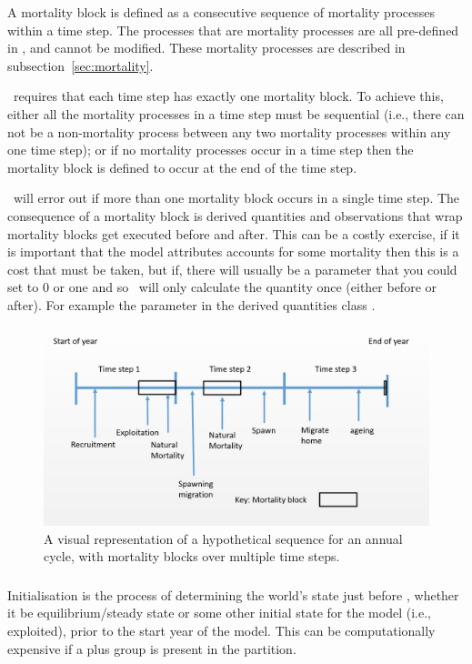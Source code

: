 A mortality block is defined as a consecutive sequence of mortality processes within a time step. The processes that are mortality processes are all pre-defined in \IBM, and cannot be modified. These mortality processes are described in subsection~\ref{sec:mortality}. 

\IBM\ requires that each time step has exactly one mortality block. To achieve this, either all the mortality processes in a time step must be sequential (i.e., there can not be a non-mortality process between any two mortality processes within any one time step); or if no mortality processes occur in a time step then the mortality block is defined to occur at the end of the time step. 

\IBM\ will error out if more than one mortality block occurs in a single time step. The consequence of a mortality block is derived quantities and observations that wrap mortality blocks get executed before and after. This can be a costly exercise, if it is important that the model attributes accounts for some mortality then this is a cost that must be taken, but if, there will usually be a parameter that you could set to 0 or one and so \IBM\ will only calculate the quantity once (either before or after). For example the parameter in the derived quantities class .

\begin{figure}[H]
	\centering
	\includegraphics[scale=0.5]{Figures/annual_cycle.jpg}
	\caption{A visual representation of a hypothetical sequence for an annual cycle, with mortality blocks over multiple time steps.}\label{Fig:annual}
\end{figure}

\subsubsection{}\label{subsec:initialisation}
Initialisation is the process of determining the world's state just before , whether it be equilibrium/steady state or some other initial state for the model (i.e., exploited), prior to the start year of the model. This can be computationally expensive if a plus group is present in the partition.

